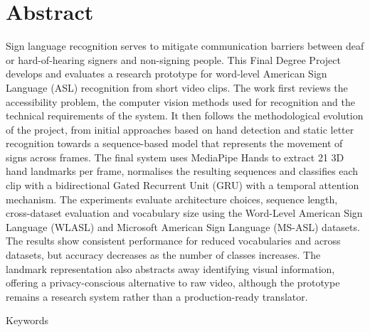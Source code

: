 \chapter*{Abstract}

Sign language recognition serves to mitigate communication barriers between deaf or hard-of-hearing
signers and non-signing people. This Final Degree Project develops and evaluates a research
prototype for word-level American Sign Language (ASL) recognition from short video clips. The work
first reviews the accessibility problem, the computer vision methods used for recognition and the
technical requirements of the system. It then follows the methodological evolution of the project,
from initial approaches based on hand detection and static letter recognition towards a
sequence-based model that represents the movement of signs across frames. The final system uses
MediaPipe Hands to extract 21 3D hand landmarks per frame, normalises the resulting sequences and
classifies each clip with a bidirectional Gated Recurrent Unit (GRU) with a temporal attention
mechanism. The experiments evaluate architecture choices, sequence length, cross-dataset evaluation
and vocabulary size using the Word-Level American Sign Language (WLASL) and Microsoft American Sign
Language (MS-ASL) datasets. The results show consistent performance for reduced vocabularies and
across datasets, but accuracy decreases as the number of classes increases. The landmark
representation also abstracts away identifying visual information, offering a privacy-conscious
alternative to raw video, although the prototype remains a research system rather than a
production-ready translator.

\begin{keywords}{Keywords}
    \mykeywords{}
\end{keywords}
